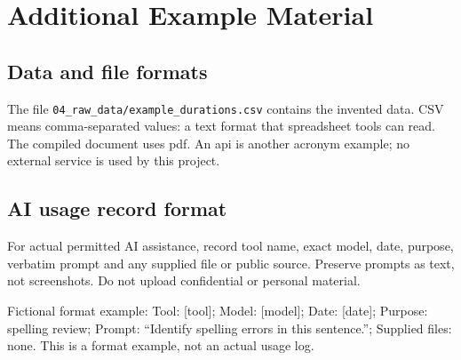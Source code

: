 \chapter{Additional Example Material}
\label{app:example}
\section{Data and file formats}
The file \texttt{04\_raw\_data/example\_durations.csv} contains the invented data.
CSV means comma-separated values: a text format that spreadsheet tools can read.
The compiled document uses \ac{pdf}. An \ac{api} is another acronym example;
no external service is used by this project.

\section{AI usage record format}
For actual permitted AI assistance, record tool name, exact model, date, purpose,
verbatim prompt and any supplied file or public source. Preserve prompts as text,
not screenshots. Do not upload confidential or personal material.

Fictional format example: Tool: [tool]; Model: [model]; Date: [date];
Purpose: spelling review; Prompt: ``Identify spelling errors in this sentence.'';
Supplied files: none. This is a format example, not an actual usage log.
